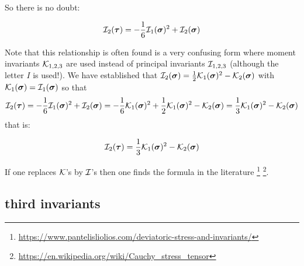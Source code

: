 So there is no doubt:
\begin{mdframed}[backgroundcolor=blue!5]
\[
{\cal I}_2(\bm\tau) =  -\frac16 {\cal I}_1(\bm\sigma)^2 + {\cal I}_2(\bm\sigma)
\]
\end{mdframed}
Note that this relationship is often found is a very confusing 
form where moment invariants ${\cal K}_{1,2,3}$ are used instead of 
principal invariants ${\cal I}_{1,2,3}$ (although the letter $I$ is used!). 
We have established that ${\cal I}_2(\bm\sigma)=\frac12 {\cal K}_1(\bm\sigma)^2-{\cal K}_2(\bm\sigma)$
with ${\cal K}_1(\bm\sigma)={\cal I}_1(\bm\sigma)$ so that 
\[
{\cal I}_2(\bm\tau) 
= -\frac16 {\cal I}_1(\bm\sigma)^2 + {\cal I}_2(\bm\sigma)
= -\frac16 {\cal K}_1(\bm\sigma)^2 + \frac12 {\cal K}_1(\bm\sigma)^2-{\cal K}_2(\bm\sigma) 
= \frac13 {\cal K}_1(\bm\sigma)^2 - {\cal K}_2(\bm\sigma)
\]
that is:
\begin{mdframed}[backgroundcolor=blue!5]
\[
{\cal I}_2(\bm\tau) =  
\frac13 {\cal K}_1(\bm\sigma)^2 - {\cal K}_2(\bm\sigma)
\]
\end{mdframed}


If one replaces ${\cal K}$'s by ${\cal I}$'s then one finds the formula in the literature 
\footnote{\url{https://www.pantelisliolios.com/deviatoric-stress-and-invariants/}}
\footnote{\url{https://en.wikipedia.org/wiki/Cauchy_stress_tensor}}.





\newpage
\subsection*{third invariants}

